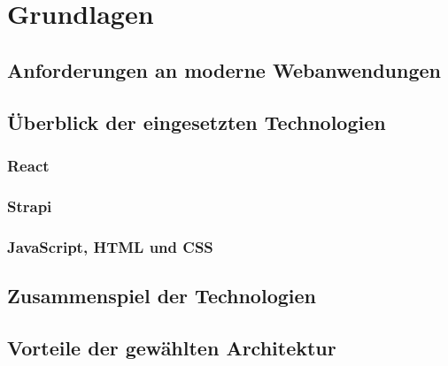 \newpage

\section{Grundlagen} \label{grundlagen}
\subsection{Anforderungen an moderne Webanwendungen} \label{anforderungen}

\subsection{Überblick der eingesetzten Technologien} \label{eingestzeTechnologien}
\subsubsection{React} \label{react}

\subsubsection{Strapi} \label{strapi}

\subsubsection{JavaScript, HTML und CSS} \label{javaHtmlCss}

\subsection{Zusammenspiel der Technologien} \label{zusammenspiel}

\subsection{Vorteile der gewählten Architektur} \label{vorteile}
